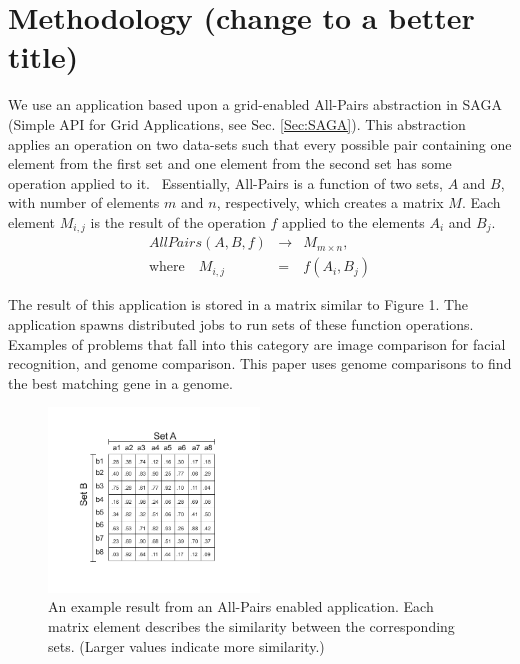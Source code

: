 \documentclass{rspublic}
\newcommand{\micnote}[1]{ {\textcolor{blue} { ***Michael: #1 }}}
\newcommand{\betynote}[1]{ {\textcolor{orange} { ***Bety: #1 }}}
\newcommand{\jhanote}[1]{} \newcommand{\micnote}[1]{}\newcommand{\betynote}[1]{} \newcommand{\fixme}[1]{}
\begin{document}
\section {Methodology (change to a better title)} We use an application
based upon a grid-enabled All-Pairs abstraction in SAGA (Simple API for
Grid Applications, see Sec. \ref{Sec:SAGA}). This abstraction applies an
operation on two data-sets such that every possible pair containing one
element from the first set and one element from the second set has some
operation applied to it.~\citep{Interop, AllPairs} \jhanote{which paper
is Interop?} Essentially,
All-Pairs is a function of two sets, $A$ and $B$, with number of
elements $m$ and $n$, respectively, which creates a matrix $M$. Each
element $M_{i,j}$ is the result of the operation $f$ applied to the
elements $A_i$ and $B_j$.
\begin{eqnarray}
 AllPairs(A, B, f) & \rightarrow & M_{m \times n}, \\
\mbox{where} \quad M_{i,j} & = & f(A_{i},B_{j})
 \end{eqnarray}

The result of this application is stored in a matrix similar to Figure
1. The application spawns distributed jobs to run sets of these function
operations.  Examples of problems that fall into this category are image
comparison for facial recognition, and genome comparison. This paper
uses genome comparisons to find the best matching gene in a genome.

\begin{figure}[!ht]
 \begin{center}
     \includegraphics[width=0.50\textwidth]{data/allpairs-exp.pdf}
\end{center}
\caption{\small An example result from an All-Pairs enabled
application.  Each matrix element describes the similarity between
 the corresponding sets. (Larger values indicate more similarity.)}
\label{Fig:All-Pairs1}
\end{figure}
\end{document}
